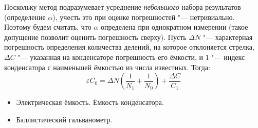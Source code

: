 \MesErrors
Поскольку метод подразумевает усреднение {\itshape небольшого} набора результатов (определение \(\alpha\)), учесть это при оценке погрешностей "--- нетривиально. Поэтому будем считать, что \(\alpha\) определена при однократном измерении (такое допущение позволит оценить погрешность сверху). Пусть \(\Delta N\) "--- характерная погрешность определения количества делений, на которое отклоняется стрелка, \(\Delta C\) "--- указанная на конденсаторе погрешность его ёмкости, и \( 1 \) "--- индекс конденсатора с наименьшей ёмкостью из числа известных.
Тогда:
\begin{equation*}
	\varepsilon C_0 = \Delta N \left( \frac{1}{N_1}+\frac{1}{N_0} \right) +\frac{\Delta C}{C_1}
\end{equation*}
\SchoolBase
\begin{itemize}
    \item Электрическая ёмкость. Ёмкость конденсатора.
    \item Баллистический гальванометр.
\end{itemize}
